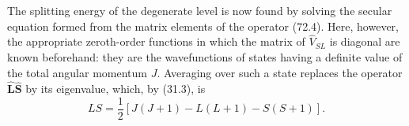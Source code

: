 The splitting energy of the degenerate level is now found by solving the secular equation formed from the matrix elements of the operator (72.4). Here, however, the appropriate zeroth-order functions in which the matrix of $\hat V_{SL}$ is diagonal are known beforehand: they are the wavefunctions of states having a definite value of the total angular momentum $J$. Averaging over such a state replaces the operator $\hat{\mathbf L}\hat{\mathbf S}$ by its eigenvalue, which, by (31.3), is
\[
 LS=\frac12[J(J+1)-L(L+1)-S(S+1)].
\]
